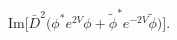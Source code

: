 \begin{equation}\label{Im_Of_Konishi}
\mbox{Im}\Bigg[\bar D^2 \Big(\phi^* e^{2V}\phi
+ \tilde\phi^* e^{-2V}\tilde\phi\Big)\Bigg].
\end{equation}

